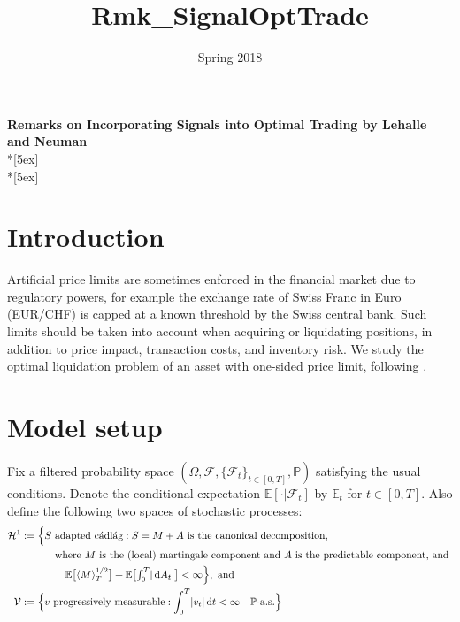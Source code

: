 \documentclass[openany,oneside]{article}
\title{Rmk_SignalOptTrade}
\date{Spring 2018}
\theoremstyle{definition}
\theoremstyle{remark}
\newcommand{\E}{\mathbb{E}} %
\renewcommand{\P}{\mathbb{P}} %
\newcommand{\F}{\mathcal{F}} %
\DeclarePairedDelimiter{\abs}{\lvert}{\rvert} %
\newcommand{\ts}{\textstyle}
\newcommand{\de}{\,\mathrm{d}}
\begin{document}
\begin{center}	
	\textbf{\Large Remarks on Incorporating Signals into Optimal Trading by Lehalle and Neuman} \\*[5ex]
    \thedate \\*[5ex]
\end{center}


\section{Introduction}
Artificial price limits are sometimes enforced in the financial market due to regulatory powers, for example the exchange rate of Swiss Franc in Euro (EUR/CHF) is capped at a known threshold by the Swiss central bank. Such limits should be taken into account when acquiring or liquidating positions, in addition to price impact, transaction costs, and inventory risk. We study the optimal liquidation problem of an asset with one-sided price limit, following \cite{lehalle2017incorporating}.


\section{Model setup}
Fix a filtered probability space $(\Omega, \F, \{\F_t\}_{t\in[0,T]}, \P)$ satisfying the usual conditions. Denote the conditional expectation $\E[\cdot \vert \F_t]$ by $\E_t$ for $t\in[0,T]$. Also define the following two spaces of stochastic processes:
\begin{align*}
\mathcal{H}^1 :=\Bigl\{ & S \textrm{ adapted c\'adl\'ag} : S=M+A \textrm{ is the canonical decomposition, } \\
& \hspace{1em}\textrm{where $M$ is the (local) martingale component and $A$ is the predictable component, and } \\
& \ts\hspace{2em}\E\bigl[\langle M\rangle^{1/2}_T\bigr] + \E\bigl[\int_0^T \abs{\de A_t}\bigr] < \infty\Bigr\}, \textrm{ and} \\
\mathcal{V} := \Bigl\{ & v \textrm{ progressively measurable} : \int_0^T \abs{v_t} \de t < \infty \quad \P\textrm{-a.s.} \Bigr\}
\end{align*}
\end{document}
